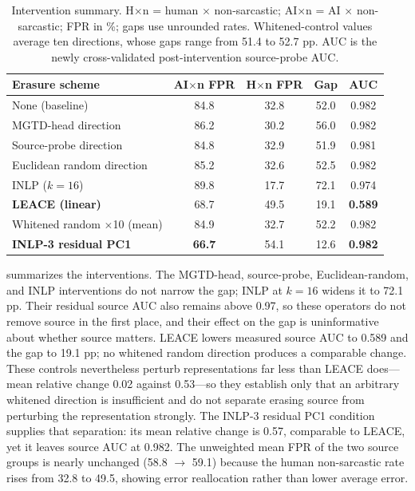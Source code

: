 \begin{table}[!t]
  \centering
  \footnotesize
  \setlength{\tabcolsep}{6pt}
  \begin{tabularx}{0.78\textwidth}{@{}>{\raggedright\arraybackslash}Xcccc@{}}
    \toprule
    \textbf{Erasure scheme} & \textbf{AI$\times$n FPR} & \textbf{H$\times$n FPR} & \textbf{Gap} & \textbf{AUC} \\
    \midrule
    None (baseline) & 84.8 & 32.8 & 52.0 & 0.982 \\
    MGTD-head direction & 86.2 & 30.2 & 56.0 & 0.982 \\
    Source-probe direction & 84.8 & 32.9 & 51.9 & 0.981 \\
    Euclidean random direction & 85.2 & 32.6 & 52.5 & 0.982 \\
    INLP ($k = 16$) & 89.8 & 17.7 & 72.1 & 0.974 \\
    \textbf{LEACE (linear)} & 68.7 & 49.5 & 19.1 & \textbf{0.589} \\
    Whitened random $\times$10 (mean) & 84.9 & 32.7 & 52.2 & 0.982 \\
    \textbf{INLP-3 residual PC1} & \textbf{66.7} & 54.1 & 12.6 & \textbf{0.982} \\
    \bottomrule
  \end{tabularx}
  \caption{Intervention summary. H$\times$n = human $\times$ non-sarcastic; AI$\times$n = AI $\times$ non-sarcastic; FPR in \%; gaps use unrounded rates. Whitened-control values average ten directions, whose gaps range from 51.4 to 52.7 pp. AUC is the newly cross-validated post-intervention source-probe AUC.}
  \label{tab:intervention}
\end{table}

 summarizes the interventions. The MGTD-head, source-probe, Euclidean-random, and INLP interventions do not narrow the gap; INLP at $k=16$ widens it to 72.1 pp. Their residual source AUC also remains above 0.97, so these operators do not remove source in the first place, and their effect on the gap is uninformative about whether source matters. LEACE lowers measured source AUC to 0.589 and the gap to 19.1 pp; no whitened random direction produces a comparable change. These controls nevertheless perturb representations far less than LEACE does---mean relative change 0.02 against 0.53---so they establish only that an arbitrary whitened direction is insufficient and do not separate erasing source from perturbing the representation strongly. The INLP-3 residual PC1 condition supplies that separation: its mean relative change is 0.57, comparable to LEACE, yet it leaves source AUC at 0.982. The unweighted mean FPR of the two source groups is nearly unchanged (58.8 $\to$ 59.1) because the human non-sarcastic rate rises from 32.8 to 49.5, showing error reallocation rather than lower average error.

